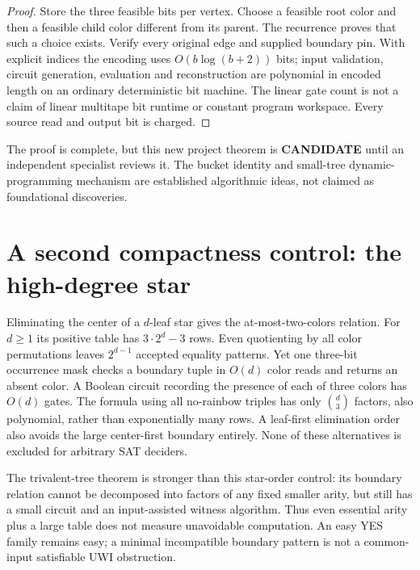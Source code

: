 \documentclass[11pt]{article}
\begin{document}
\begin{proof}
Store the three feasible bits per vertex. Choose a feasible root color and
then a feasible child color different from its parent. The recurrence proves
that such a choice exists. Verify every original edge and supplied boundary
pin. With explicit indices the encoding uses $O(b\log(b+2))$ bits; input
validation, circuit generation, evaluation and reconstruction are polynomial
in encoded length on an ordinary deterministic bit machine. The linear gate
count is not a claim of linear multitape bit runtime or constant program
workspace. Every source read and output bit is charged.
\end{proof}

The proof is complete, but this new project theorem is \textbf{CANDIDATE}
until an independent specialist reviews it. The bucket identity and
small-tree dynamic-programming mechanism are established algorithmic ideas,
not claimed as foundational discoveries.

\section{A second compactness control: the high-degree star}
Eliminating the center of a $d$-leaf star gives the at-most-two-colors relation.
For $d\ge1$ its positive table has $3\cdot2^d-3$ rows. Even quotienting by
all color permutations leaves $2^{d-1}$ accepted equality patterns. Yet one
three-bit occurrence mask checks a boundary tuple in $O(d)$ color reads and
returns an absent color. A Boolean circuit recording the presence of each
of three colors has $O(d)$ gates. The formula using all no-rainbow triples
has only $\binom d3$ factors, also polynomial, rather than exponentially many
rows. A leaf-first elimination order also avoids the large center-first
boundary entirely. None of these alternatives is excluded for arbitrary
SAT deciders.

The trivalent-tree theorem is stronger than this star-order control: its
boundary relation cannot be decomposed into factors of any fixed smaller
arity, but still has a small circuit and an input-assisted witness algorithm.
Thus even essential arity plus a large table does not measure unavoidable
computation. An easy YES family remains easy; a minimal incompatible boundary
pattern is not a common-input satisfiable UWI obstruction.
\end{document}
